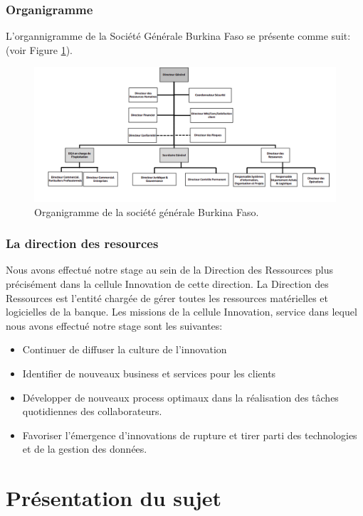   \subsubsection{Organigramme}  
L'organnigramme de la Société Générale Burkina Faso se présente comme suit: 
(voir Figure \ref{fig:organigramme}).
 \begin{figure}[h!]
  \begin{center}
    \includegraphics[width=17cm]{images/organigramme.png}
\caption{Organigramme de la société générale Burkina
Faso.\label{fig:organigramme}}
\end{center}
\end{figure}


  \subsubsection{La direction des resources}

Nous avons effectué notre stage au sein de la Direction des Ressources plus précisément
dans la cellule Innovation de cette direction. La Direction des Ressources est 
l’entité chargée de gérer toutes les ressources matérielles et logicielles de la
banque. Les missions de la cellule Innovation, service dans lequel nous avons 
effectué notre stage sont les suivantes:
\begin{itemize}
  \item Continuer de diffuser la culture de l’innovation
  \item Identifier de nouveaux business et services pour les clients
  \item Développer de nouveaux process optimaux dans la réalisation des tâches quotidiennes
    des collaborateurs.
  \item Favoriser l’émergence d’innovations de rupture et tirer parti des technologies et de
    la gestion des données.
\end{itemize}
 
 \section{Présentation du sujet}

